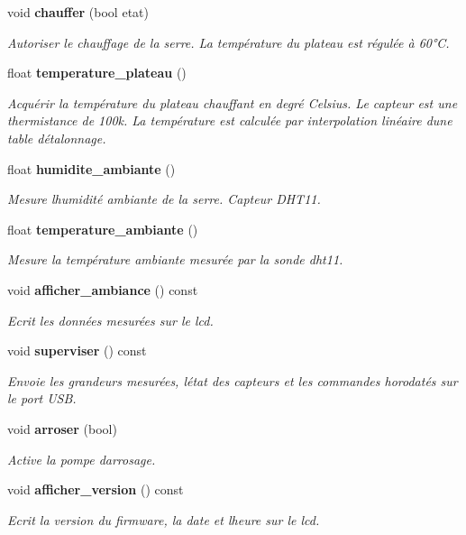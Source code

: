 \begin{DoxyCompactItemize}
void \textbf{ chauffer} (bool etat)
\begin{DoxyCompactList}\small\item\em Autoriser le chauffage de la serre. La température du plateau est régulée à 60°C. \end{DoxyCompactList}\item 
float \textbf{ temperature\+\_\+plateau} ()
\begin{DoxyCompactList}\small\item\em Acquérir la température du plateau chauffant en degré Celsius. Le capteur est une thermistance de 100k. La température est calculée par interpolation linéaire d\textquotesingle{}une table d\textquotesingle{}étalonnage. \end{DoxyCompactList}\item 
float \textbf{ humidite\+\_\+ambiante} ()
\begin{DoxyCompactList}\small\item\em Mesure l\textquotesingle{}humidité ambiante de la serre. Capteur D\+H\+T11. \end{DoxyCompactList}\item 
float \textbf{ temperature\+\_\+ambiante} ()
\begin{DoxyCompactList}\small\item\em Mesure la température ambiante mesurée par la sonde dht11. \end{DoxyCompactList}\item 
void \textbf{ afficher\+\_\+ambiance} () const
\begin{DoxyCompactList}\small\item\em Ecrit les données mesurées sur le lcd. \end{DoxyCompactList}\item 
void \textbf{ superviser} () const
\begin{DoxyCompactList}\small\item\em Envoie les grandeurs mesurées, l\textquotesingle{}état des capteurs et les commandes horodatés sur le port U\+SB. \end{DoxyCompactList}\item 
void \textbf{ arroser} (bool)
\begin{DoxyCompactList}\small\item\em Active la pompe d\textquotesingle{}arrosage. \end{DoxyCompactList}\item 
void \textbf{ afficher\+\_\+version} () const
\begin{DoxyCompactList}\small\item\em Ecrit la version du firmware, la date et l\textquotesingle{}heure sur le lcd. \end{DoxyCompactList}\item 

\end{DoxyCompactItemize}
